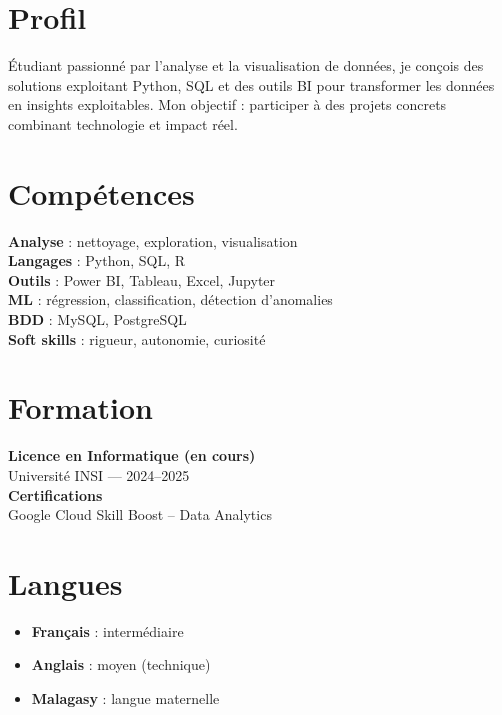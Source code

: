 \documentclass[a4paper,10pt]{article}
\begin{document}
\begin{minipage}[t]{0.38\textwidth}

\section*{Profil}
Étudiant passionné par l'analyse et la visualisation de données, je conçois des solutions exploitant Python, SQL et des outils BI pour transformer les données en insights exploitables. Mon objectif : participer à des projets concrets combinant technologie et impact réel.

\section*{Compétences}
\begin{skillbox}
\textbf{Analyse} : nettoyage, exploration, visualisation\\
\textbf{Langages} : Python, SQL, R\\
\textbf{Outils} : Power BI, Tableau, Excel, Jupyter\\
\textbf{ML} : régression, classification, détection d'anomalies\\
\textbf{BDD} : MySQL, PostgreSQL\\
\textbf{Soft skills} : rigueur, autonomie, curiosité
\end{skillbox}

\section*{Formation}
\textbf{Licence en Informatique (en cours)}\\
Université INSI — 2024–2025\\[4pt]
\textbf{Certifications}\\
Google Cloud Skill Boost – Data Analytics

\section*{Langues}
\begin{itemize}[leftmargin=*, label={}]
  \item \textbf{Français} : intermédiaire
  \item \textbf{Anglais} : moyen (technique)
  \item \textbf{Malagasy} : langue maternelle
\end{itemize}

\end{minipage}
\end{document}
